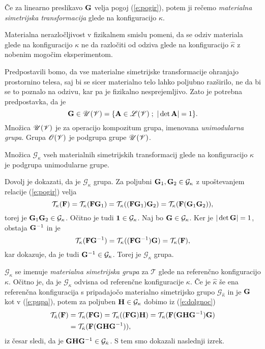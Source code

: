 \begin{definicija}
	Če za linearno preslikavo $\mathbf G$ velja pogoj (\ref{e:pogir}), potem ji rečemo
	\emph{materialna simetrijska transformacija} gle\-de na konfiguracijo $\kappa$.
\end{definicija}

Materialna nerazločljivost v fizikalnem smislu pomeni, da se odziv materiala
glede na konfiguracijo $\kappa$ ne da razločiti od odziva glede na konfiguracijo
$\hat{\kappa}$ z nobenim mogočim eksperimentom.

Predpostavili bomo, da vse materialne simetrijske transformacije ohranjajo prostornino telesa,
saj bi se sicer materialno telo lahko poljubno razši\-rilo, ne da bi se to poznalo na odzivu,
kar pa je fizikalno nesprejemljivo. Zato je potrebna predpostavka, da je
\[
	\ten{G}\in\mathscr{U}(\V)=\{\ten{A}\in\L(\V)\;;\ |\det\ten{A}|=1 \}.
\]
Množica $\mathscr{U}(\mathscr V)$ je za operacijo kompozitum grupa, imenovana \emph{unimodularna grupa}.
Grupa $\mathscr{O}(\mathscr V)$ je podgrupa grupe $\mathscr{U}(\mathscr V)$.

\begin{izrek}
	Množica $\mathcal{G}_{\kappa}$ vseh materialnih simetrijskih transformacij glede
	na konfiguracijo $\kappa$ je podgrupa unimodularne grupe.
\end{izrek}

\proof
	Dovolj je dokazati, da je $\mathcal{G}_{\kappa}$ grupa. Za poljubni $\mathbf G_1,\mathbf G_2\in\mathcal{G}_{\kappa}$
	z upoštevanjem relacije (\ref{e:pogir}) velja
	\[
		\mathcal{T}_{\kappa}(\mathbf F)=\mathcal{T}_{\kappa}(\mathbf F\mathbf G_1)
		=\mathcal{T}_{\kappa}((\mathbf F\mathbf G_1)\mathbf G_2)=\mathcal{T}_{\kappa}(\mathbf F(\mathbf G_1\mathbf G_2)),
	\]
	torej je $\mathbf G_1\mathbf G_2\in\mathcal{G}_{\kappa}$. Očitno je tudi $\mathbf 1\in\mathcal{G}_{\kappa}$.
	Naj bo $\mathbf G\in\mathcal{G}_{\kappa}$. Ker je $|\det\mathbf G|=1$, obstaja $\mathbf G^{-1}$ in je
	\[
		\mathcal{T}_{\kappa}(\mathbf F\mathbf G^{-1})=\mathcal{T}_{\kappa}((\mathbf F\mathbf G^{-1})\mathbf G)
		=\mathcal{T}_{\kappa}(\mathbf F),
	\]
	kar dokazuje, da je tudi $\mathbf G^{-1}\in\mathcal{G}_{\kappa}$. Torej je $\mathcal{G}_{\kappa}$ grupa.
\endproof

$\mathcal{G}_{\kappa}$ se imenuje \emph{materialna simetrijska grupa} za $\mathcal{T}$ glede
na referenčno konfiguracijo $\kappa$. Očitno je, da je $\mathcal{G}_{\kappa}$ odvisna od
referenčne konfiguracije $\kappa$. Če je $\hat{\kappa}$ še ena referenčna konfiguracija
s pripadajočo materialno simetrijsko grupo $\mathcal{G}_{\hat{\kappa}}$
in je $\mathbf G$ kot v (\ref{e:pupa}), potem za poljuben
$\mathbf H\in\mathcal{G}_{\kappa}$ dobimo iz (\ref{e:dolgnoc})
\begin{align*}
	\mathcal{T}_{\hat{\kappa}}(\mathbf F)&=\mathcal{T}_{\kappa}(\mathbf F\mathbf G)
	=\mathcal{T}_{\kappa}((\mathbf F\mathbf G)\mathbf H)
	=\mathcal{T}_{\kappa}(\mathbf F(\mathbf G\mathbf H\mathbf G^{-1})\mathbf G) \\
	&=\mathcal{T}_{\hat{\kappa}}(\mathbf F(\mathbf G\mathbf H\mathbf G^{-1})),
\end{align*}
iz česar sledi, da je $\mathbf G\mathbf H\mathbf G^{-1}\in\mathcal{G}_{\hat{\kappa}}$.
S tem smo dokazali naslednji izrek.

